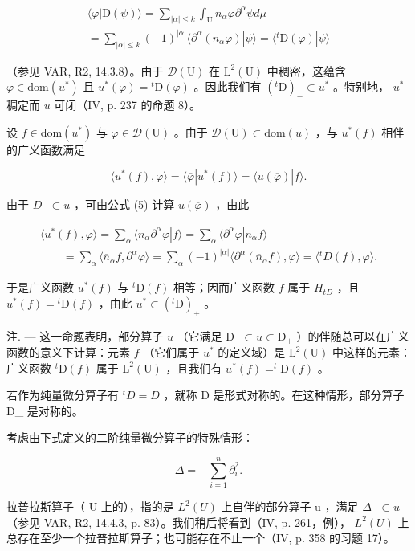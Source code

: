 \[
\begin{array}{c} \langle \varphi | \mathrm{D} (\psi) \rangle = \sum_ {| \alpha | \leqslant k} \int_ {\mathrm{U}} n _ {\alpha} \overline {{\varphi}} \partial^ {\alpha} \psi d \mu \\ = \sum_ {| \alpha | \leqslant k} (- 1) ^ {| \alpha |} \langle \partial^ {\alpha} (\overline {{n}} _ {\alpha} \varphi) | \psi \rangle = \langle {} ^ {t} \mathrm{D} (\varphi) | \psi \rangle \end{array}
\]

（参见 VAR, R2, 14.3.8）。由于 \(\mathcal{D}(\mathrm{U})\) 在 \(\mathrm{L}^2 (\mathrm{U})\) 中稠密，这蕴含 \(\varphi \in \mathrm{dom}(u^{*})\) 且 \(u^{*}(\varphi) = {}^{t}\mathrm{D}(\varphi)\) 。因此我们有 \(({}^{t}\mathrm{D})_{-}\subset u^{*}\) 。特别地， \(u^{*}\) 稠定而 \(u\) 可闭（IV, p. 237 的命题 8）。

设 \(f \in \mathrm{dom}(u^{*})\) 与 \(\varphi \in \mathcal{D}(\mathrm{U})\) 。由于 \(\mathcal{D}(\mathrm{U}) \subset \mathrm{dom}(u)\) ，与 \(u^{*}(f)\) 相伴的广义函数满足

\[
\langle u ^ {*} (f), \varphi \rangle = \langle \overline {{\varphi}} | u ^ {*} (f) \rangle = \langle u (\overline {{\varphi}}) | f \rangle .
\]

由于 \(D_{-} \subset u\) ，可由公式 (5) 计算 \(u(\overline{\varphi})\) ，由此

\[
\begin{array}{l} \langle u ^ {*} (f), \varphi \rangle = \sum_ {\alpha} \langle n _ {\alpha} \partial^ {\alpha} \overline {{\varphi}} | f \rangle = \sum_ {\alpha} \langle \partial^ {\alpha} \overline {{\varphi}} | \overline {{n}} _ {\alpha} f \rangle \\ \qquad = \sum_ {\alpha} \langle \overline {{n}} _ {\alpha} f, \partial^ {\alpha} \varphi \rangle = \sum_ {\alpha} (- 1) ^ {| \alpha |} \langle \partial^ {\alpha} (\overline {{n}} _ {\alpha} f), \varphi \rangle = \langle {} ^ {t} D (f), \varphi \rangle . \end{array}
\]

于是广义函数 \(u^{*}(f)\) 与 \({}^{t}\mathrm{D}(f)\) 相等；因而广义函数 \(f\) 属于 \(H_{tD}\) ，且 \(u^{*}(f)={}^{t}\mathrm{D}(f)\) ，由此 \(u^{*}\subset({}^{t}\mathrm{D})_{+}\) 。

注. --- 这一命题表明，部分算子 \(u\) （它满足 \(\mathrm{D}_{-} \subset u \subset \mathrm{D}_{+}\) ）的伴随总可以在广义函数的意义下计算：元素 \(f\) （它们属于 \(u^{*}\) 的定义域）是 \(\mathrm{L}^{2}(\mathrm{U})\) 中这样的元素：广义函数 \(^{t}\mathrm{D}(f)\) 属于 \(\mathrm{L}^{2}(\mathrm{U})\) ，且我们有 \(u^{*}(f) = ^{t}\mathrm{D}(f)\) 。

若作为纯量微分算子有 \({}^{t}D = D\) ，就称 D 是形式对称的。在这种情形，部分算子 D\_ 是对称的。

考虑由下式定义的二阶纯量微分算子的特殊情形：

\[
\Delta = - \sum_ {i = 1} ^ {n} \partial_ {i} ^ {2}.
\]

拉普拉斯算子（ U 上的），指的是 \(L^{2}(U)\) 上自伴的部分算子 u ，满足 \(\Delta_{-} \subset u\) （参见 VAR, R2, 14.4.3, p. 83）。我们稍后将看到（IV, p. 261，例）， \(L^{2}(U)\) 上总存在至少一个拉普拉斯算子；也可能存在不止一个（IV, p. 358 的习题 17）。